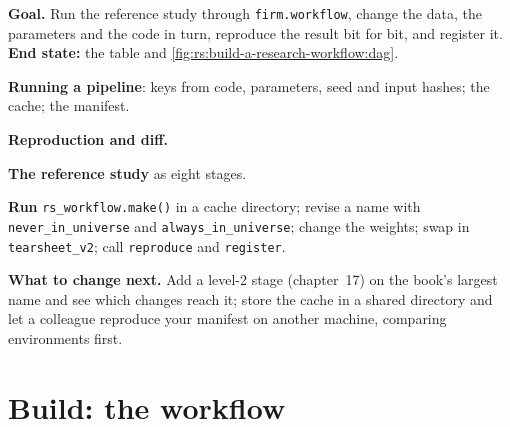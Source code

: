\begin{tutorial}
\textbf{Goal.} Run the reference study through \texttt{firm.workflow}, change the data, the parameters and the code in turn, reproduce the result bit for bit, and
register it. \textbf{End state:} the table and \cref{fig:rs:build-a-research-workflow:dag}.
\begin{tutsteps}
\item \textbf{Running a pipeline}: keys from code, parameters, seed and input hashes; the cache; the manifest.
\label{lst:rs:build-a-research-workflow:run}
\item \textbf{Reproduction and diff.}
\label{lst:rs:build-a-research-workflow:repro}
\item \textbf{The reference study} as eight stages.
\label{lst:rs:build-a-research-workflow:make}
\item \textbf{Run} \texttt{rs\_workflow.make()} in a cache directory; revise a name with \texttt{never\_in\_universe} and \texttt{always\_in\_universe}; change the
weights; swap in \texttt{tearsheet\_v2}; call \texttt{reproduce} and \texttt{register}.
\end{tutsteps}
\textbf{What to change next.} Add a level-2 stage (chapter~17) on the book's largest name and see which changes reach it; store the cache in a shared directory and
let a colleague reproduce your manifest on another machine, comparing environments first.
\end{tutorial}

\section{Build: the workflow}\label{bld:rs:build-a-research-workflow:workflow}

